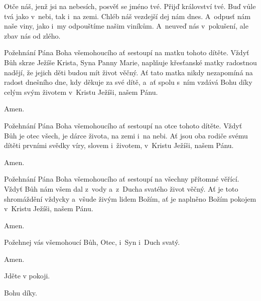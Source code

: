 \pars{}


\mbox{}

Otče náš, jenž jsi na nebesích,
posvěť se jméno tvé.
Přijď království tvé.
Buď vůle tvá jako v~nebi, tak i~na zemi.
Chléb náš vezdejší dej nám dnes.
A~odpusť nám naše viny,
jako i~my odpouštíme našim viníkům.
A~neuveď nás v~pokušení,
ale zbav nás od zlého.

\pars{}


Požehnání Pána Boha všemohoucího ať sestoupí na matku tohoto dítěte.
Vždyť Bůh skrze Ježíše Krista, Syna Panny Marie, naplňuje křesťanské matky radostnou nadějí,
že jejich děti budou mít život věčný. Ať tato matka nikdy nezapomíná na radost dnešního dne,
kdy děkuje za své dítě, a~ať spolu s~ním vzdává Bohu díky celým svým životem v~Kristu Ježíši,
našem Pánu.

 Amen.

 Požehnání Pána Boha všemohoucího ať sestoupí na otce tohoto dítěte.
Vždyť Bůh je otec všech, je dárce života, na zemi i~na nebi.
Ať jsou oba rodiče svému dítěti prvními svědky víry, slovem i~životem, v~Kristu Ježíši, našem Pánu.

 Amen.

 Požehnání Pána Boha všemohoucího ať sestoupí na všechny přítomné věřící.
Vždyť Bůh nám všem dal z~vody a~z~Ducha svatého život věčný. Ať je toto shromáždění vždycky
a~všude živým lidem Božím, ať je naplněno Božím pokojem v~Kristu Ježíši, našem Pánu.

 Amen.

 Požehnej vás všemohoucí Bůh,
Otec, i~Syn \grecross{} i~Duch svatý.

 Amen.

 Jděte v pokoji.

 Bohu díky.
